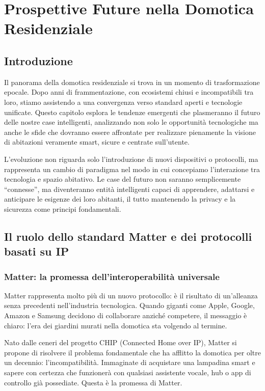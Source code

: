 \chapter{Prospettive Future nella Domotica Residenziale}

\section{Introduzione}

Il panorama della domotica residenziale si trova in un momento di trasformazione epocale. Dopo anni di frammentazione, con ecosistemi chiusi e incompatibili tra loro, stiamo assistendo a una convergenza verso standard aperti e tecnologie unificate. Questo capitolo esplora le tendenze emergenti che plasmeranno il futuro delle nostre case intelligenti, analizzando non solo le opportunità tecnologiche ma anche le sfide che dovranno essere affrontate per realizzare pienamente la visione di abitazioni veramente smart, sicure e centrate sull'utente.

L'evoluzione non riguarda solo l'introduzione di nuovi dispositivi o protocolli, ma rappresenta un cambio di paradigma nel modo in cui concepiamo l'interazione tra tecnologia e spazio abitativo. Le case del futuro non saranno semplicemente ``connesse'', ma diventeranno entità intelligenti capaci di apprendere, adattarsi e anticipare le esigenze dei loro abitanti, il tutto mantenendo la privacy e la sicurezza come principi fondamentali.

\section{Il ruolo dello standard Matter e dei protocolli basati su IP}

\subsection{Matter: la promessa dell'interoperabilità universale}

Matter rappresenta molto più di un nuovo protocollo: è il risultato di un'alleanza senza precedenti nell'industria tecnologica. Quando giganti come Apple, Google, Amazon e Samsung decidono di collaborare anziché competere, il messaggio è chiaro: l'era dei giardini murati nella domotica sta volgendo al termine.

Nato dalle ceneri del progetto CHIP (Connected Home over IP), Matter si propone di risolvere il problema fondamentale che ha afflitto la domotica per oltre un decennio: l'incompatibilità. Immaginate di acquistare una lampadina smart e sapere con certezza che funzionerà con qualsiasi assistente vocale, hub o app di controllo già possediate. Questa è la promessa di Matter.

